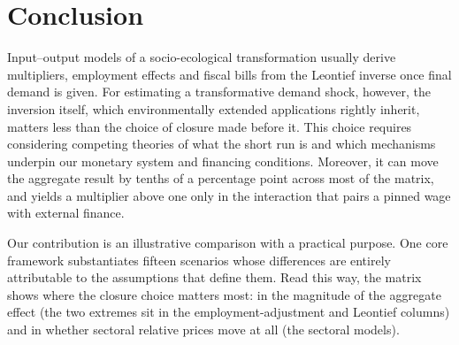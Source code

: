 \section{Conclusion}\label{sec:conclusion}

Input--output models of a socio-ecological transformation usually derive multipliers, employment effects and fiscal bills from the Leontief inverse once final demand is given. For estimating a transformative demand shock, however, the inversion itself, which environmentally extended applications rightly inherit, matters less than the choice of closure made before it. This choice requires considering competing theories of what the short run is and which mechanisms underpin our monetary system and financing conditions. Moreover, it can move the aggregate result by tenths of a percentage point across most of the matrix, and yields a multiplier above one only in the interaction that pairs a pinned wage with external finance.

Our contribution is an illustrative comparison with a practical purpose. One core framework substantiates fifteen scenarios whose differences are entirely attributable to the assumptions that define them. Read this way, the matrix shows where the closure choice matters most: in the magnitude of the aggregate effect (the two extremes sit in the employment-adjustment and Leontief columns) and in whether sectoral relative prices move at all (the sectoral models).

